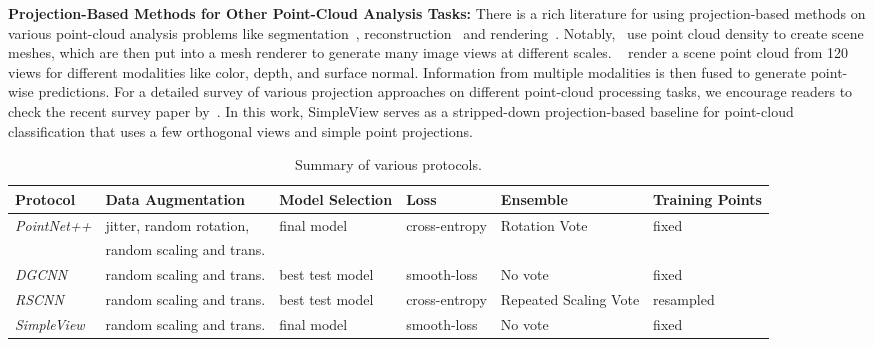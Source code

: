 \documentclass{article}
\newcommand\method{SimpleView}
\begin{document}
\noindent\textbf{Projection-Based Methods for Other Point-Cloud Analysis Tasks: } There is a rich literature for using projection-based methods on various point-cloud analysis problems like segmentation~\citep{ladicky2010and,tighescalable,riemenschneider2014learning,qin2018deep,dai20183dmv,kalogerakis20173d,tatarchenko2018tangent}, reconstruction~\citep{pittaluga2019revealing} and rendering~\citep{aliev2019neural}. Notably,~\cite{boulch2017unstructured} use point cloud density to create scene meshes, which are then put into a mesh renderer to generate many image views at different scales. ~\cite{lawin2017deep} render a scene point cloud from 120 views for different modalities like color, depth, and surface normal. Information from multiple modalities is then fused to generate point-wise predictions. For a detailed survey of various projection approaches on different point-cloud processing tasks, we encourage readers to check the recent survey paper by~\citep{guo2020deep}. In this work, \method{} serves as a stripped-down projection-based baseline for point-cloud classification that uses a few orthogonal views and simple point projections. 
\begin{table*}[ht]
  \caption{Summary of various protocols.}
  \label{tab:protocols}
  \centering
  \begin{tabular}{l l l l l l}
    \toprule
    Protocol     & Data Augmentation & Model Selection & Loss & Ensemble & Training Points\\
    \midrule
    \textit{PointNet++}   & jitter, random rotation,& final model & cross-entropy & Rotation Vote & fixed \\
     & random scaling and trans. &  &  & &  \\
    \textit{DGCNN}      & random scaling and trans. & best test model  & smooth-loss & No vote & fixed \\
    \textit{RSCNN}     & random scaling and trans. & best test model & cross-entropy & Repeated Scaling Vote & resampled \\
    \textit{SimpleView} & random scaling and trans. & final model & smooth-loss & No vote & fixed \\
    \bottomrule
  \end{tabular}
\end{table*}
\end{document}
